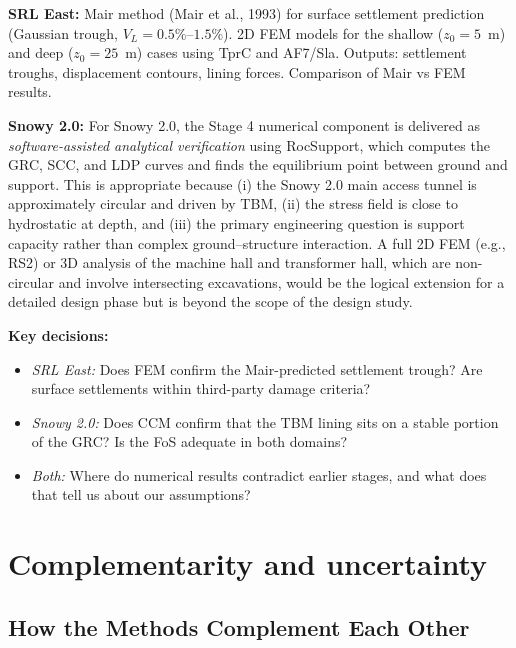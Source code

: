 \textbf{SRL East:} Mair method (Mair et al., 1993) for surface settlement prediction (Gaussian trough, $V_L = 0.5\%$--$1.5\%$). 2D FEM models for the shallow ($z_0=5$~m) and deep ($z_0=25$~m) cases using TprC and AF7/Sla. Outputs: settlement troughs, displacement contours, lining forces. Comparison of Mair vs FEM results.

\textbf{Snowy 2.0:} For Snowy 2.0, the Stage 4 numerical component is delivered as \textit{software-assisted analytical verification} using RocSupport, which computes the GRC, SCC, and LDP curves and finds the equilibrium point between ground and support. This is appropriate because (i) the Snowy 2.0 main access tunnel is approximately circular and driven by TBM, (ii) the stress field is close to hydrostatic at depth, and (iii) the primary engineering question is support capacity rather than complex ground--structure interaction. A full 2D FEM (e.g., RS2) or 3D analysis of the machine hall and transformer hall, which are non-circular and involve intersecting excavations, would be the logical extension for a detailed design phase but is beyond the scope of the design study.

\textbf{Key decisions:}
\begin{itemize}[nosep]
 \item \textit{SRL East:} Does FEM confirm the Mair-predicted settlement trough? Are surface settlements within third-party damage criteria?
 \item \textit{Snowy 2.0:} Does CCM confirm that the TBM lining sits on a stable portion of the GRC? Is the FoS adequate in both domains?
 \item \textit{Both:} Where do numerical results contradict earlier stages, and what does that tell us about our assumptions?
\end{itemize}

\section{Complementarity and uncertainty}
\label{sec:complementarity-and-uncertainty}

\subsection{How the Methods Complement Each Other}

